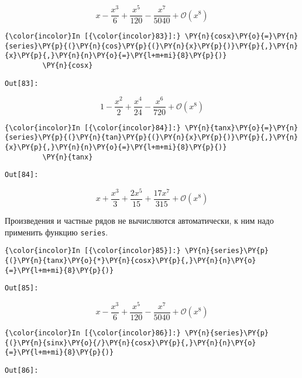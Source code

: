     \[x - \frac{x^{3}}{6} + \frac{x^{5}}{120} - \frac{x^{7}}{5040} + \mathcal{O}\left(x^{8}\right)\]

    

    \begin{Verbatim}[commandchars=\\\{\}]
{\color{incolor}In [{\color{incolor}83}]:} \PY{n}{cosx}\PY{o}{=}\PY{n}{series}\PY{p}{(}\PY{n}{cos}\PY{p}{(}\PY{n}{x}\PY{p}{)}\PY{p}{,}\PY{n}{x}\PY{p}{,}\PY{n}{n}\PY{o}{=}\PY{l+m+mi}{8}\PY{p}{)}
         \PY{n}{cosx}
\end{Verbatim}
\texttt{\color{outcolor}Out[{\color{outcolor}83}]:}
    
    \[1 - \frac{x^{2}}{2} + \frac{x^{4}}{24} - \frac{x^{6}}{720} + \mathcal{O}\left(x^{8}\right)\]

    

    \begin{Verbatim}[commandchars=\\\{\}]
{\color{incolor}In [{\color{incolor}84}]:} \PY{n}{tanx}\PY{o}{=}\PY{n}{series}\PY{p}{(}\PY{n}{tan}\PY{p}{(}\PY{n}{x}\PY{p}{)}\PY{p}{,}\PY{n}{x}\PY{p}{,}\PY{n}{n}\PY{o}{=}\PY{l+m+mi}{8}\PY{p}{)}
         \PY{n}{tanx}
\end{Verbatim}
\texttt{\color{outcolor}Out[{\color{outcolor}84}]:}
    
    \[x + \frac{x^{3}}{3} + \frac{2 x^{5}}{15} + \frac{17 x^{7}}{315} + \mathcal{O}\left(x^{8}\right)\]

    

    Произведения и частные рядов не вычисляются автоматически, к ним надо
применить функцию \texttt{series}.

    \begin{Verbatim}[commandchars=\\\{\}]
{\color{incolor}In [{\color{incolor}85}]:} \PY{n}{series}\PY{p}{(}\PY{n}{tanx}\PY{o}{*}\PY{n}{cosx}\PY{p}{,}\PY{n}{n}\PY{o}{=}\PY{l+m+mi}{8}\PY{p}{)}
\end{Verbatim}
\texttt{\color{outcolor}Out[{\color{outcolor}85}]:}
    
    \[x - \frac{x^{3}}{6} + \frac{x^{5}}{120} - \frac{x^{7}}{5040} + \mathcal{O}\left(x^{8}\right)\]

    

    \begin{Verbatim}[commandchars=\\\{\}]
{\color{incolor}In [{\color{incolor}86}]:} \PY{n}{series}\PY{p}{(}\PY{n}{sinx}\PY{o}{/}\PY{n}{cosx}\PY{p}{,}\PY{n}{n}\PY{o}{=}\PY{l+m+mi}{8}\PY{p}{)}
\end{Verbatim}
\texttt{\color{outcolor}Out[{\color{outcolor}86}]:}
    
